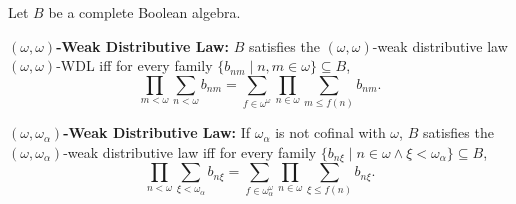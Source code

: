 Let $B$ be a complete Boolean algebra.

\textbf{$(\omega, \omega)$-Weak Distributive Law:}
$B$ satisfies the $(\omega, \omega)$-weak distributive law $(\omega, \omega)$-WDL iff for every family $\{b_{nm} \mid n, m \in \omega\} \subseteq B$,
$$\prod_{m < \omega} \sum_{n < \omega} b_{nm} = \sum_{f \in \omega^{\omega}} \prod_{n \in \omega} \sum_{m \leq f(n)} b_{nm}.$$

\textbf{$(\omega, \omega_{\alpha})$-Weak Distributive Law:}
If $\omega_{\alpha}$ is not cofinal with $\omega$, $B$ satisfies the $(\omega, \omega_{\alpha})$-weak distributive law iff for every family $\{b_{n\xi} \mid n \in \omega \land \xi < \omega_{\alpha}\} \subseteq B$,
$$\prod_{n < \omega} \sum_{\xi < \omega_{\alpha}} b_{n\xi} = \sum_{f \in \omega_{\alpha}^{\omega}} \prod_{n \in \omega} \sum_{\xi \leq f(n)} b_{n\xi}.$$
